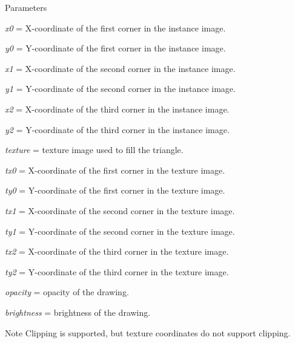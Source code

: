 \begin{DoxyParams}{Parameters}
\item[{\em x0}]= X-\/coordinate of the first corner in the instance image. \item[{\em y0}]= Y-\/coordinate of the first corner in the instance image. \item[{\em x1}]= X-\/coordinate of the second corner in the instance image. \item[{\em y1}]= Y-\/coordinate of the second corner in the instance image. \item[{\em x2}]= X-\/coordinate of the third corner in the instance image. \item[{\em y2}]= Y-\/coordinate of the third corner in the instance image. \item[{\em texture}]= texture image used to fill the triangle. \item[{\em tx0}]= X-\/coordinate of the first corner in the texture image. \item[{\em ty0}]= Y-\/coordinate of the first corner in the texture image. \item[{\em tx1}]= X-\/coordinate of the second corner in the texture image. \item[{\em ty1}]= Y-\/coordinate of the second corner in the texture image. \item[{\em tx2}]= X-\/coordinate of the third corner in the texture image. \item[{\em ty2}]= Y-\/coordinate of the third corner in the texture image. \item[{\em opacity}]= opacity of the drawing. \item[{\em brightness}]= brightness of the drawing. \end{DoxyParams}
\begin{DoxyNote}{Note}
Clipping is supported, but texture coordinates do not support clipping. 
\end{DoxyNote}
